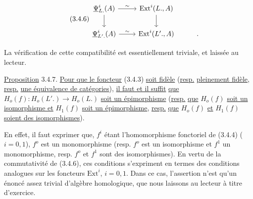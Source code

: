 \begin{equation}\tag{3.4.6}
\begin{tikzcd}
\underline{\Psi}^i_{L.}(A) \arrow[r, "\sim"] \arrow[d] & \mathrm{Ext}^i(L.,A) \arrow[d] \\
\underline{\Psi}^i_{L'.}(A) \arrow[r, "\sim"] & \mathrm{Ext}^i(L'.,A) & .
\end{tikzcd}
\end{equation}


La vérification de cette compatibilité est essentiellement triviale, et laissée au lecteur.

\underline{Proposition} 3.4.7. \underline{Pour que le foncteur} (3.4.3) \underline{soit fidèle} (\underline{resp.} \underline{pleinement fidèle}, \underline{resp.} \underline{une équivalence de catégories}), \underline{il faut et il suffit} \underline{que} $H_o(f) : H_o(L'.) \longrightarrow H_o(L.)$ \underline{soit un épimorphisme} (\underline{resp.} \underline{que} $H_o(f)$ \underline{soit un isomorphisme et} $H_1(f)$ \underline{soit un épimorphisme}, \underline{resp.} \underline{que} $H_o(f)$ \underline{et} $H_1(f)$ \underline{soient des isomorphismes}).

En effet, il faut exprimer que, $f^i$ étant l'homomorphisme fonctoriel de (3.4.4) ($i=0,1$), $f^o$ est un monomorphisme (resp. $f^o$ est un isomorphisme et $f^1$ un monomorphisme, resp. $f^o$ et $f^1$ sont des isomorphismes). En vertu de la commutativité de (3.4.6), ces conditions s'expriment en termes des conditions analogues sur les foncteurs $\mathrm{Ext}^i$, $i=0,1$. Dans ce cas, l'assertion n'est qu'un énoncé assez trivial d'algèbre homologique, que nous laissons au lecteur à titre d'exercice.

